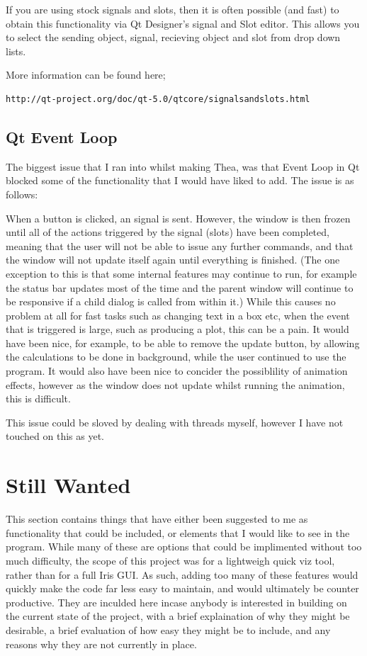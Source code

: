 \documentclass[whitecover]{MO_report}
\begin{document}
If you are using stock signals and slots, then it is often possible (and fast)
to obtain this functionality via Qt Designer's signal and Slot editor.
This allows you to select the sending object, signal, recieving object and slot
from drop down lists.

More information can be found here;

\begin{verbatim}
http://qt-project.org/doc/qt-5.0/qtcore/signalsandslots.html
\end{verbatim}

\section{Qt Event Loop}

The biggest issue that I ran into whilst making Thea, was that Event Loop in
Qt blocked some of the functionality that I would have liked to add.
The issue is as follows:

When a button is clicked, an signal is sent. However, the window is then frozen
until all of the actions triggered by the signal (slots) have been completed,
meaning that the user will not be able to issue any further commands, and that
the window will not update itself again until everything is finished. (The
one exception to this is that some internal features may continue to run, for
example the status bar updates most of the time and the parent window will
continue to be responsive if a child dialog is called from within it.)
While this causes no problem at all for fast tasks such as changing text in a
box etc, when the event that is triggered is large, such as producing a plot,
this can be a pain. It would have been nice, for example, to be able to remove
the update button, by allowing the calculations to be done in background, while
the user continued to use the program. It would also have been nice to concider
the possiblility of animation effects, however as the window does not update
whilst running the animation, this is difficult.

This issue could be sloved by dealing with threads myself, however I have not
touched on this as yet.


\pagebreak


\chapter{Still Wanted}

This section contains things that have either been suggested to me as
functionality that could be included, or elements that I would like to see in
the program. While many of these are options that could be implimented
without too much difficulty, the scope of this project was for a lightweigh
quick viz tool, rather than for a full Iris GUI. As such, adding too many of
these features would quickly make the code far less easy to maintain, and
would ultimately be counter productive. They are inculded here incase anybody
is interested in building on the current state of the project, with a brief
explaination of why they might be desirable, a brief evaluation of how easy
they might be to include, and any reasons why they are not currently in place.
\end{document}
